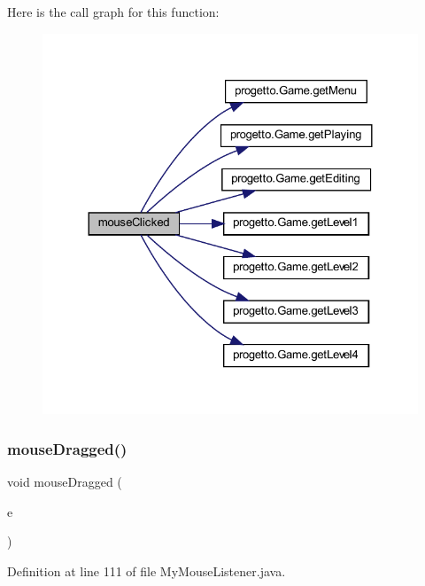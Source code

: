 Here is the call graph for this function\+:\nopagebreak
\begin{figure}[H]
\begin{center}
\leavevmode
\includegraphics[width=324pt]{classinputs_1_1_my_mouse_listener_a45d56bd84238e8b56589dfc732e2b2cf_cgraph}
\end{center}
\end{figure}
\mbox{\label{classinputs_1_1_my_mouse_listener_adbfc0588c017133c9b7070474402b72f}} 
\subsubsection{\texorpdfstring{mouse\+Dragged()}{mouseDragged()}}
{\footnotesize\ttfamily void mouse\+Dragged (\begin{DoxyParamCaption}\item[{Mouse\+Event}]{e }\end{DoxyParamCaption})}



Definition at line 111 of file My\+Mouse\+Listener.\+java.

